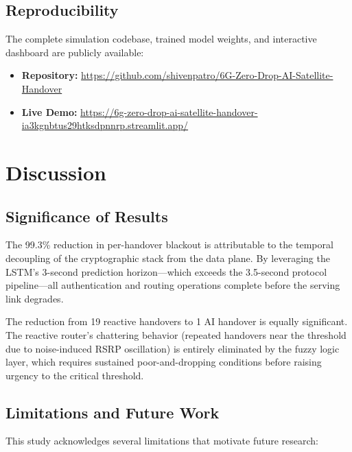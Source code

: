 \documentclass[conference]{IEEEtran}
\begin{document}
\subsection{Reproducibility}

The complete simulation codebase, trained model weights, and interactive dashboard are publicly available:
\begin{itemize}
    \item \textbf{Repository:} \url{https://github.com/shivenpatro/6G-Zero-Drop-AI-Satellite-Handover}
    \item \textbf{Live Demo:} \url{https://6g-zero-drop-ai-satellite-handover-ia3kgnbtus29htksdpnnrp.streamlit.app/}
\end{itemize}

\section{Discussion}

\subsection{Significance of Results}

The 99.3\% reduction in per-handover blackout is attributable to the temporal decoupling of the cryptographic stack from the data plane. By leveraging the LSTM's 3-second prediction horizon---which exceeds the 3.5-second protocol pipeline---all authentication and routing operations complete before the serving link degrades.

The reduction from 19 reactive handovers to 1 AI handover is equally significant. The reactive router's chattering behavior (repeated handovers near the threshold due to noise-induced RSRP oscillation) is entirely eliminated by the fuzzy logic layer, which requires sustained poor-and-dropping conditions before raising urgency to the critical threshold.

\subsection{Limitations and Future Work}

This study acknowledges several limitations that motivate future research:
\end{document}
